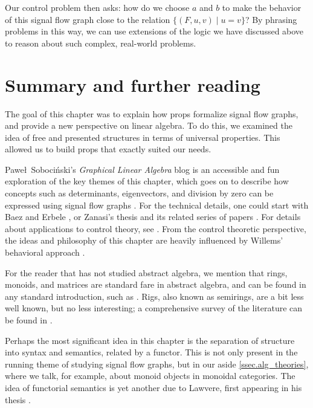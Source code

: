 \documentclass[7Sketches]{subfiles}
\begin{document}
Our control problem then asks: how do we choose $a$ and $b$ to make the
behavior of this signal flow graph close to the relation $\{(F,u,v)\mid u=v\}$? By
phrasing problems in this way, we can use extensions of the logic we have
discussed above to reason about such complex, real-world problems.


\section{Summary and further reading}%
\label{sec.ch5_further_reading}

The goal of this chapter was to explain how props formalize signal flow graphs,
and provide a new perspective on linear algebra. To do this, we examined the
idea of free and presented structures in terms of universal properties. This
allowed us to build props that exactly suited our needs.

Pawe\l\ Soboci\'nski's \emph{Graphical Linear Algebra} blog is an accessible and
fun exploration of the key themes of this chapter, which goes on to describe how
concepts such as determinants, eigenvectors, and division by zero
can be expressed using signal flow graphs \cite{Sobocinski:blog}. For
the technical details, one could start with Baez and Erbele
\cite{Baez.Erbele:2015a}, or Zanasi's thesis \cite{zanasi:thesis} and its
related series of papers
\cite{bonchi2014categorical,bonchi2015full,Bonchi.Sobocinski.Zanasi:2017a}.  For
details about applications to control theory, see
\cite{Fong.Sobocinski.Rapisardo:2016a}. From the control theoretic perspective,
the ideas and philosophy of this chapter are heavily influenced by Willems'
behavioral approach \cite{Willems:2007a}.

For the reader that has not studied abstract algebra, we mention that rings,
monoids, and matrices are standard fare in abstract algebra, and can be found in
any standard introduction, such as \cite{Fraleign:1967a}. Rigs, also known as
semirings, are a bit less well known, but no less interesting; a comprehensive
survey of the literature can be found in \cite{Glazek:2013a}.%

Perhaps the most significant idea in this chapter is the separation of structure
into syntax and semantics, related by a functor. This is not only present in the
running theme of studying signal flow graphs, but in our aside
\cref{ssec.alg_theories}, where we talk, for example, about monoid objects in
monoidal categories. The idea of functorial semantics is yet another due to
Lawvere, first appearing in his thesis \cite{Lawvere:2004}.

%
%
\end{document}
